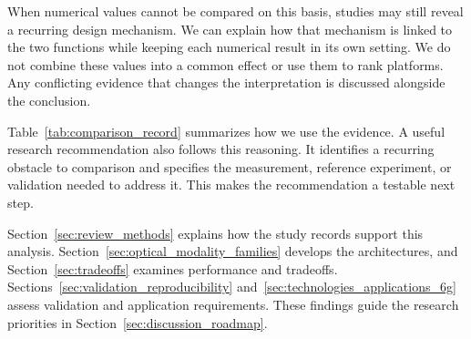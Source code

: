 When numerical values cannot be compared on this basis, studies may still
reveal a recurring design mechanism. We can explain how that mechanism is
linked to the two functions while keeping each numerical result in its own
setting. We do not combine these values into a common effect or use them to
rank platforms. Any conflicting evidence that changes the interpretation is
discussed alongside the conclusion.

Table~\ref{tab:comparison_record} summarizes how we use the evidence. A useful
research recommendation also follows this reasoning. It identifies a
recurring obstacle to comparison and specifies the measurement, reference
experiment, or validation needed to address it. This makes the recommendation
a testable next step.

Section~\ref{sec:review_methods} explains how the study records support this
analysis. Section~\ref{sec:optical_modality_families} develops the architectures,
and Section~\ref{sec:tradeoffs} examines performance and tradeoffs.
Sections~\ref{sec:validation_reproducibility}
and~\ref{sec:technologies_applications_6g} assess validation and application
requirements. These findings guide the research priorities in
Section~\ref{sec:discussion_roadmap}.

\FloatBarrier
